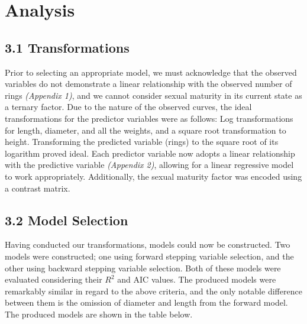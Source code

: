 \documentclass[letterpaper,9pt,twocolumn,twoside,]{pinp}
\begin{document}
\hypertarget{analysis}{%
\section{Analysis}\label{analysis}}

\hypertarget{transformations}{%
\subsection{3.1 Transformations}\label{transformations}}

Prior to selecting an appropriate model, we must acknowledge that the
observed variables do not demonstrate a linear relationship with the
observed number of rings \emph{(Appendix 1)}, and we cannot consider
sexual maturity in its current state as a ternary factor. Due to the
nature of the observed curves, the ideal transformations for the
predictor variables were as follows: Log transformations for length,
diameter, and all the weights, and a square root transformation to
height. Transforming the predicted variable (rings) to the square root
of its logarithm proved ideal. Each predictor variable now adopts a
linear relationship with the predictive variable \emph{(Appendix 2)},
allowing for a linear regressive model to work appropriately.
Additionally, the sexual maturity factor was encoded using a contrast
matrix.

\hypertarget{model-selection}{%
\subsection{3.2 Model Selection}\label{model-selection}}

Having conducted our transformations, models could now be constructed.
Two models were constructed; one using forward stepping variable
selection, and the other using backward stepping variable selection.
Both of these models were evaluated considering their \(R^2\) and AIC
values. The produced models were remarkably similar in regard to the
above criteria, and the only notable difference between them is the
omission of diameter and length from the forward model. The produced
models are shown in the table below.
\end{document}
